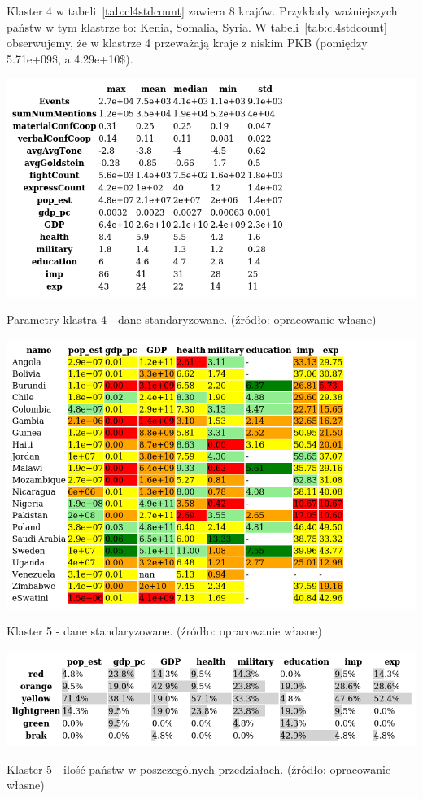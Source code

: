 \documentclass[11pt]{report}
\begin{document}
    Klaster 4 w tabeli~\ref{tab:cl4stdcount} zawiera 8 krajów.
    Przykłady ważniejszych państw w tym klastrze to: Kenia, Somalia, Syria.
    W tabeli~\ref{tab:cl4stdcount} obserwujemy, że w klastrze 4 przeważają kraje z niskim PKB (pomiędzy 5.71e+09\$, a 4.29e+10\$).

    \begin{table}[!htp]
        \centering
        \includegraphics[width=\linewidth]{tables/CLUST/desc/clust4std_desc.png}
        \caption{Parametry klastra 4 - dane standaryzowane. (źródło: opracowanie własne)}
        \label{tab:cl4std_desc}
    \end{table}

    \begin{table}[!htp]
        \centering
        \includegraphics[width=\linewidth]{tables/CLUST/cluster5stdkmeans.png}
        \caption{Klaster 5 - dane standaryzowane. (źródło: opracowanie własne)}
        \label{tab:cl5std}
    \end{table}

    \begin{table}[!htp]
        \centering
        \includegraphics[width=\linewidth]{tables/CLUST/cluster5stdkmeanscount.png}
        \caption{Klaster 5 - ilość państw w poszczególnych przedziałach. (źródło: opracowanie własne)}
        \label{tab:cl5stdcount}
    \end{table}
\end{document}
